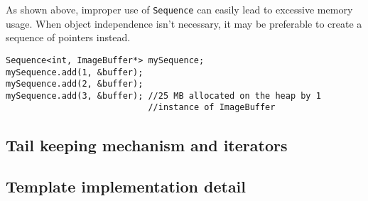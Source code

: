 ﻿\documentclass{report}
\begin{document}
As shown above, improper use of {\tt Sequence} can easily lead to excessive
memory usage. When object independence isn't necessary, it may be preferable
to create a sequence of pointers instead.

\begin{verbatim}
Sequence<int, ImageBuffer*> mySequence;
mySequence.add(1, &buffer);
mySequence.add(2, &buffer);
mySequence.add(3, &buffer); //25 MB allocated on the heap by 1
                            //instance of ImageBuffer
\end{verbatim}

\subsection{Tail keeping mechanism and iterators}
\subsection{Template implementation detail}
\end{document}
